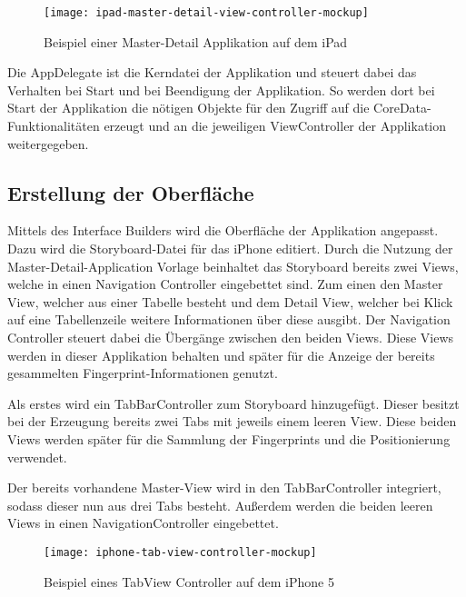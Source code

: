 \begin{figure}[htb!]
		\centering
	\texttt{[image: ipad-master-detail-view-controller-mockup]}
	\caption{Beispiel einer Master-Detail Applikation auf dem iPad}
	\label{master-detail-view-controller}
\end{figure}

Die AppDelegate ist die Kerndatei der Applikation und steuert dabei das Verhalten bei Start und bei Beendigung der Applikation. So werden dort bei Start der Applikation die nötigen Objekte für den Zugriff auf die CoreData-Funktionalitäten erzeugt und an die jeweiligen ViewController der Applikation weitergegeben.


\subsection{Erstellung der Oberfläche}
\label{sec:}

Mittels des Interface Builders wird die Oberfläche der Applikation angepasst. Dazu wird die Storyboard-Datei für das iPhone editiert.
Durch die Nutzung der Master-Detail-Application Vorlage beinhaltet das Storyboard bereits zwei Views, welche in einen Navigation Controller eingebettet sind. 
Zum einen den Master View, welcher aus einer Tabelle besteht und dem Detail View, welcher bei Klick auf eine Tabellenzeile weitere Informationen über diese ausgibt. 
Der Navigation Controller steuert dabei die Übergänge zwischen den beiden Views.
Diese Views werden in dieser Applikation behalten und später für die Anzeige der bereits gesammelten Fingerprint-Informationen genutzt.

Als erstes wird ein TabBarController zum Storyboard hinzugefügt. Dieser besitzt bei der Erzeugung bereits zwei Tabs mit jeweils einem leeren View. Diese beiden Views werden später für die Sammlung der Fingerprints und die Positionierung verwendet.

Der bereits vorhandene Master-View wird in den TabBarController integriert, sodass dieser nun aus drei Tabs besteht. Außerdem werden die beiden leeren Views in einen NavigationController eingebettet.

\begin{figure}[htb!]
		\centering
	\texttt{[image: iphone-tab-view-controller-mockup]}
	\caption{Beispiel eines TabView Controller auf dem iPhone 5}
	\label{iphone-tab-view-controller}
\end{figure}

